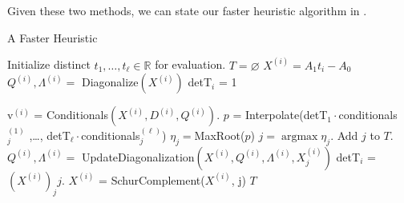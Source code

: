 \documentclass{amsart}
\theoremstyle{definition}
\newcommand{\R}{\mathbb{R}}
\DeclareMathOperator{\argmax}{argmax}
\begin{document}
Given these two methods, we can state our faster heuristic algorithm in .
\begin{algorithm}
    \caption{A Faster Heuristic}
    \label{alg:faster}
    \begin{algorithmic}
        \State Initialize distinct $t_1 ,\dots, t_{\ell} \in \R$ for evaluation.
        \State $T = \varnothing$
            \State $X^{(i)} =  A_1t_i-A_0$
            \State $Q^{(i)}, \Lambda^{(i)} =$ Diagonalize$(X^{(i)})$
            \State detT$_i$ = 1
        \EndFor

            \State v$^{(i)}$ = Conditionals$(X^{(i)}, D^{(i)}, Q^{(i)})$.
            \EndFor
            \State $p$ = Interpolate(detT$_1\cdot$conditionals$^{(1)}_j$ ,\dots, detT$_{\ell}\cdot$conditionals$^{(\ell)}_j$)
                \State $\eta_j = $MaxRoot($p$)
            \EndFor
            \State $j=\argmax \eta_j$.
            \State Add $j$ to $T$.
                \State $Q^{(i)}, \Lambda^{(i)} =$ UpdateDiagonalization$(X^{(i)}, Q^{(i)}, \Lambda^{(i)}, X^{(i)}_j)$
                \State detT$_i$ = $(X^{(i)})_jj$.
                \State $X^{(i)}$ = SchurComplement($X^{(i)}$, j)
            \EndFor
        \EndFor
        \Return $T$
        \EndProcedure
    \end{algorithmic}
\end{algorithm}
\end{document}
